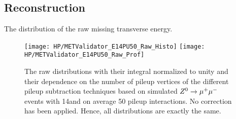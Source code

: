 \subsection{\texorpdfstring{\MET{}}{MET} Reconstruction  \label{sec:HPUAppE14PU50MC}}

The distribution of the raw missing transverse energy. 

\begin{figure}[h!t]
  \centering
  \texttt{[image: HP/METValidator\_E14PU50\_Raw\_Histo]}
  \texttt{[image: HP/METValidator\_E14PU50\_Raw\_Prof]}
  \caption[The raw \MET{} distributions and their dependence on the number of pileup vertices for different pileup subtraction techniques based on simulated  $\Zz\rightarrow\MM$ events with 14\TeV and PU=50]{The raw \MET{} distributions with their integral normalized to unity and their dependence on the number of pileup vertices of the different pileup subtraction techniques based on simulated  $\Zz\rightarrow\MM$ events with 14\TeV and on average 50 pileup interactions. No correction has been applied. Hence, all distributions are exactly the same.}
\end{figure}


